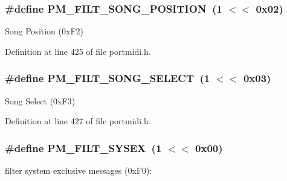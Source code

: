 \subsubsection[{\texorpdfstring{P\+M\+\_\+\+F\+I\+L\+T\+\_\+\+S\+O\+N\+G\+\_\+\+P\+O\+S\+I\+T\+I\+ON}{PM_FILT_SONG_POSITION}}]{\setlength{\rightskip}{0pt plus 5cm}\#define P\+M\+\_\+\+F\+I\+L\+T\+\_\+\+S\+O\+N\+G\+\_\+\+P\+O\+S\+I\+T\+I\+ON~(1 $<$$<$ 0x02)}\hypertarget{group__grp__events__filters_ga830ecd4a62070c6e76352eea4524f537}{}\label{group__grp__events__filters_ga830ecd4a62070c6e76352eea4524f537}
Song Position (0x\+F2) 

Definition at line 425 of file portmidi.\+h.

\subsubsection[{\texorpdfstring{P\+M\+\_\+\+F\+I\+L\+T\+\_\+\+S\+O\+N\+G\+\_\+\+S\+E\+L\+E\+CT}{PM_FILT_SONG_SELECT}}]{\setlength{\rightskip}{0pt plus 5cm}\#define P\+M\+\_\+\+F\+I\+L\+T\+\_\+\+S\+O\+N\+G\+\_\+\+S\+E\+L\+E\+CT~(1 $<$$<$ 0x03)}\hypertarget{group__grp__events__filters_ga45af83115b0e12767e99f619801f49b5}{}\label{group__grp__events__filters_ga45af83115b0e12767e99f619801f49b5}
Song Select (0x\+F3) 

Definition at line 427 of file portmidi.\+h.

\subsubsection[{\texorpdfstring{P\+M\+\_\+\+F\+I\+L\+T\+\_\+\+S\+Y\+S\+EX}{PM_FILT_SYSEX}}]{\setlength{\rightskip}{0pt plus 5cm}\#define P\+M\+\_\+\+F\+I\+L\+T\+\_\+\+S\+Y\+S\+EX~(1 $<$$<$ 0x00)}\hypertarget{group__grp__events__filters_ga3ef53d51914740bb7746e017b5a44402}{}\label{group__grp__events__filters_ga3ef53d51914740bb7746e017b5a44402}
filter system exclusive messages (0x\+F0)\+: 

